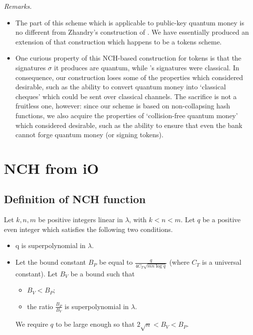 \documentclass{article}
\begin{document}
\noindent \textit{Remarks.}
\begin{itemize}
    \item The part of this scheme which is applicable to public-key quantum money is no different from Zhandry's construction of \cite{zha17}. We have essentially produced an extension of that construction which happens to be a tokens scheme.
    \item One curious property of this NCH-based construction for tokens is that the signatures $\sigma$ it produces are quantum, while \cite{tokens}'s signatures were classical. In consequence, our construction loses some of the properties which \cite{tokens} considered desirable, such as the ability to convert quantum money into `classical cheques' which could be sent over classical channels. The sacrifice is not a fruitless one, however: since our scheme is based on non-collapsing hash functions, we also acquire the properties of `collision-free quantum money' which \cite{zha17} considered desirable, such as the ability to ensure that even the bank cannot forge quantum money (or signing tokens).
\end{itemize}

\clearpage

\section{NCH from iO}

\subsection{Definition of NCH function}
\label{section:defnch}

Let $k, n, m$ be positive integers linear in $\lambda$, with $k < n < m$. Let $q$ be a positive even integer which satisfies the following two conditions.
\begin{itemize}
	\item q is superpolynomial in $\lambda$.
	\item Let the bound constant $B_P$ be equal to $\frac{q}{4C_T \sqrt{mn \log q}}$ (where $C_T$ is a universal constant). Let $B_V$ be a bound such that
		\begin{itemize}
			\item $B_V < B_P$;
			\item the ratio $\frac{B_P}{B_V}$ is superpolynomial in $\lambda$.
		\end{itemize}
		We require $q$ to be large enough so that $2\sqrt{n} < B_V < B_P$.
\end{itemize}
\end{document}
